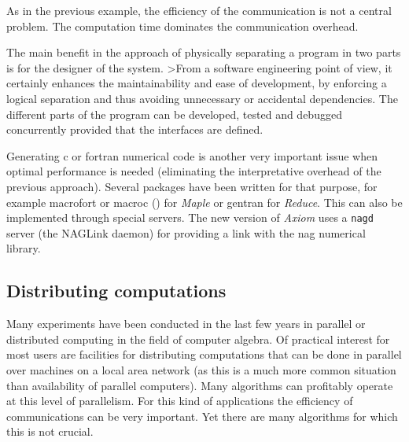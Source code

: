 \documentclass {article}
\begin{document}

As in the previous example, the efficiency of the communication is not a
central problem. The computation time dominates the communication overhead.

The main benefit in the approach of physically separating a program in two
parts is for the designer of the system. 
>From a software engineering point of view, 
it certainly enhances the maintainability and ease of development, by
enforcing a logical separation and thus avoiding unnecessary or accidental
dependencies. The different parts of the program can be developed, tested and
debugged concurrently provided that the interfaces are defined. 

Generating {\sc c} or {\sc fortran} numerical code is another very important
issue when optimal performance is needed (eliminating the interpretative
overhead of the previous approach). 
Several packages have been written for that purpose, for example 
{\sc macrofort} or {\sc macroc} (\cite{MacroC}) for {\sl Maple} or 
{\sc gentran} for {\sl Reduce}. 
This can also be implemented through special servers. The new version of 
{\sl Axiom} uses a {\tt nagd} server (the NAGLink daemon) for providing a
link with the {\sc nag} numerical library.

\subsection*{ Distributing computations}

Many experiments have been conducted in the last few years in 
parallel or distributed computing in the field of computer algebra.
Of practical interest  for most users are
facilities for distributing computations that can be done in parallel over
machines on a local area network (as this is a much more common situation
than availability of parallel computers). 
Many algorithms can profitably operate at this level of parallelism.
For this kind of applications the efficiency of communications can be very
important. Yet there are many algorithms for which this is not crucial.
\end{document}
